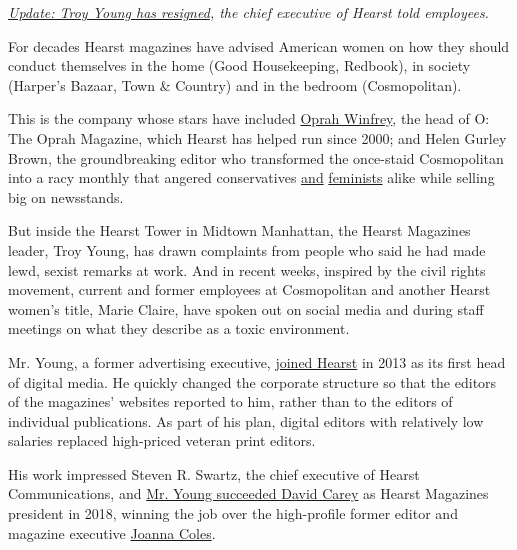 \href{https://www.nytimes.com/2020/07/23/business/troy-young-hearst-magazines.html}{\emph{Update:
Troy Young has resigned}}\emph{, the chief executive of Hearst told
employees.}

For decades Hearst magazines have advised American women on how they
should conduct themselves in the home (Good Housekeeping, Redbook), in
society (Harper's Bazaar, Town \& Country) and in the bedroom
(Cosmopolitan).

This is the company whose stars have included
\href{https://www.nytimes.com/2000/04/03/business/winfrey-breaks-new-ground-with-magazine.html}{Oprah
Winfrey}, the head of O: The Oprah Magazine, which Hearst has helped run
since 2000; and Helen Gurley Brown, the groundbreaking editor who
transformed the once-staid Cosmopolitan into a racy monthly that angered
conservatives
\href{https://www.newyorker.com/books/page-turner/owning-your-desire-remembering-helen-gurley-brown}{and}
\href{https://www.nytimes.com/1974/08/11/archives/two-faces-of-ms-versus-cosmo.html}{feminists}
alike while selling big on newsstands.

But inside the Hearst Tower in Midtown Manhattan, the Hearst Magazines
leader, Troy Young, has drawn complaints from people who said he had
made lewd, sexist remarks at work. And in recent weeks, inspired by the
civil rights movement, current and former employees at Cosmopolitan and
another Hearst women's title, Marie Claire, have spoken out on social
media and during staff meetings on what they describe as a toxic
environment.

Mr. Young, a former advertising executive,
\href{https://www.nytimes.com/2013/05/09/business/media/hearst-magazines-hires-troy-young-as-digital-media-chief.html}{joined
Hearst} in 2013 as its first head of digital media. He quickly changed
the corporate structure so that the editors of the magazines' websites
reported to him, rather than to the editors of individual publications.
As part of his plan, digital editors with relatively low salaries
replaced high-priced veteran print editors.

His work impressed Steven R. Swartz, the chief executive of Hearst
Communications, and
\href{https://www.nytimes.com/2018/07/25/business/hearst-magazines-president.html}{Mr.
Young succeeded David Carey} as Hearst Magazines president in 2018,
winning the job over the high-profile former editor and magazine
executive
\href{https://www.nytimes.com/2018/08/06/business/media/joanna-coles-troy-young-hearst.html}{Joanna
Coles}.

